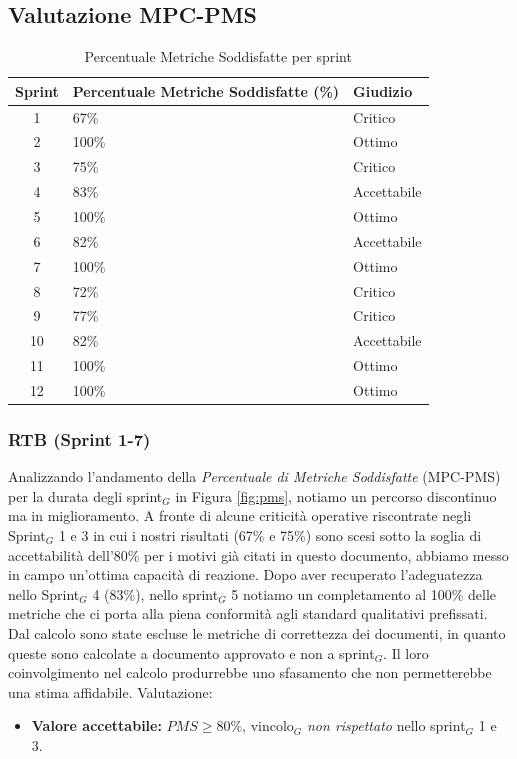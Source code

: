 \documentclass[a4paper, 10pt, colorlinks=true, linkcolor=black, urlcolor=blue, citecolor=blue, hidelinks]{article}
\begin{document}
\subsection{Valutazione MPC-PMS}
\begin{table}[H]
    \centering
	\begin{tabular}{|c|l|p{3cm}|}
		\hline
		\textbf{Sprint} & \textbf{Percentuale Metriche Soddisfatte (\%)} & \textbf{Giudizio} \\
		\hline
		1 & 67\% & Critico\\ 
		\hline
        2 & 100\% & Ottimo \\
        \hline
        3 & 75\% & Critico \\
        \hline
        4 & 83\% & Accettabile \\
        \hline
        5 & 100\% & Ottimo  \\
        \hline
        6 & 82\%& Accettabile \\
        \hline
        7 & 100\% & Ottimo \\
        \hline
        8 & 72\% & Critico \\
        \hline
        9 & 77\% & Critico \\
        \hline
        10 & 82\% & Accettabile \\
        \hline
        11 & 100\% & Ottimo \\
        \hline
        12 & 100\% & Ottimo \\
        \hline
	\end{tabular}
	\caption{Percentuale Metriche Soddisfatte per sprint}
	\label{tab:pms}
\end{table}

\subsubsection{RTB (Sprint 1-7)}
Analizzando l'andamento della \textit{Percentuale di Metriche Soddisfatte} (MPC-PMS) per la durata degli sprint$_G$ in Figura \ref{fig:pms}, notiamo un percorso discontinuo ma in miglioramento. A fronte di alcune criticità operative riscontrate negli Sprint$_G$ 1 e 3 in cui i nostri risultati (67\% e 75\%) sono scesi sotto la soglia di accettabilità dell'80\% per i motivi già citati in questo documento, abbiamo messo in campo un'ottima capacità di reazione. Dopo aver recuperato l'adeguatezza nello Sprint$_G$ 4 (83\%), nello sprint$_G$ 5 notiamo un completamento al 100\% delle metriche che ci porta alla piena conformità agli standard qualitativi prefissati. 
Dal calcolo sono state escluse le metriche di correttezza dei documenti, in quanto queste sono calcolate a documento approvato e non a sprint$_G$. Il loro coinvolgimento nel calcolo produrrebbe uno sfasamento che non permetterebbe una stima affidabile. Valutazione:
\begin{itemize}
    \item \textbf{Valore accettabile:} $PMS \geq 80\%$, vincolo$_G$ \textit{non rispettato} nello sprint$_G$ 1 e 3.
\end{itemize}
\end{document}
